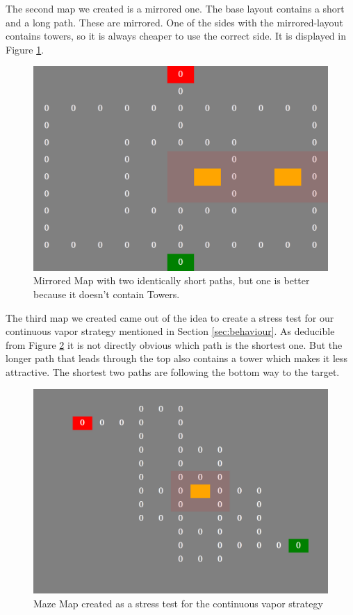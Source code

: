 The second map we created is a mirrored one. The base layout contains a short and a long path. These are mirrored. One of the sides with the mirrored-layout contains towers, so it is always cheaper to use the correct side. It is displayed in Figure \ref{fig:mapsmirror}.

\begin{figure}[H]
  \centering
  \includegraphics[width=1\linewidth]{images/map_mirror}
  \caption{Mirrored Map with two identically short paths, but one is better because it doesn't contain Towers.}
  \label{fig:mapsmirror}
\end{figure}


The third map we created came out of the idea to create a stress test for our continuous vapor strategy mentioned in Section \ref{sec:behaviour}. As deducible from Figure \ref{fig:mapsmaze} it is not directly obvious which path is the shortest one. But the longer path that leads through the top also contains a tower which makes it less attractive. The shortest two paths are following the bottom way to the target.

\begin{figure}[H]
  \centering
  \includegraphics[width=1\linewidth]{images/map_maze}
  \caption{Maze Map created as a stress test for the continuous vapor strategy}
  \label{fig:mapsmaze}
\end{figure}
